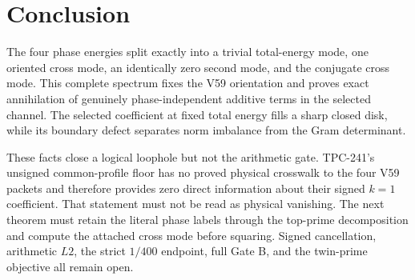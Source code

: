 \section{Conclusion}

The four phase energies split exactly into a trivial total-energy mode, one
oriented cross mode, an identically zero second mode, and the conjugate cross
mode.  This complete spectrum fixes the V59 orientation and proves exact
annihilation of genuinely phase-independent additive terms in the selected
channel.  The selected coefficient at fixed total energy fills a sharp closed
disk, while its boundary defect separates norm imbalance from the Gram
determinant.

These facts close a logical loophole but not the arithmetic gate.  TPC-241's
unsigned common-profile floor has no proved physical crosswalk to the four V59
packets and therefore provides zero direct information about their signed
$k=1$ coefficient.  That statement must not be read as physical vanishing.
The next theorem must retain the literal phase labels through the top-prime
decomposition and compute the attached cross mode before squaring.  Signed
cancellation, arithmetic $L2$, the strict $1/400$ endpoint, full Gate B, and
the twin-prime objective all remain open.
